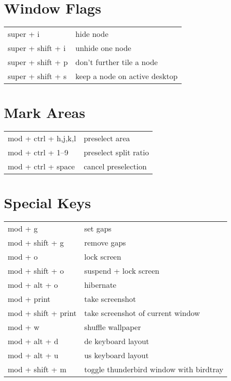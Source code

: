 \documentclass[
    10pt,
    a4paper,
    notitlepage,
]{scrartcl}
\begin{document}
\section{Window Flags}
\begin{tabular}{p{4cm}l}
    super + i           & hide node                         \\
    super + shift + i   & unhide one node                   \\
    super + shift + p   & don't further tile a node         \\
    super + shift + s   & keep a node on active desktop
\end{tabular}

\section{Mark Areas}
\begin{tabular}{p{4cm}l}
    mod + ctrl + h,j,k,l  & preselect area                    \\
    mod + ctrl + 1--9     & preselect split ratio             \\
    mod + ctrl + space    & cancel preselection
\end{tabular}

\section{Special Keys}
\begin{tabular}{p{4cm}l}
    mod + g             & set gaps                                  \\
    mod + shift + g     & remove gaps                               \\
    mod + o             & lock screen                               \\
    mod + shift + o     & suspend + lock screen                     \\
    mod + alt + o       & hibernate                                 \\
    mod + print         & take screenshot                           \\
    mod + shift + print & take screenshot of current window         \\
    mod + w             & shuffle wallpaper                         \\
    mod + alt + d       & de keyboard layout                        \\
    mod + alt + u       & us keyboard layout                        \\
    mod + shift + m     & toggle thunderbird window with birdtray
\end{tabular}
\end{document}
